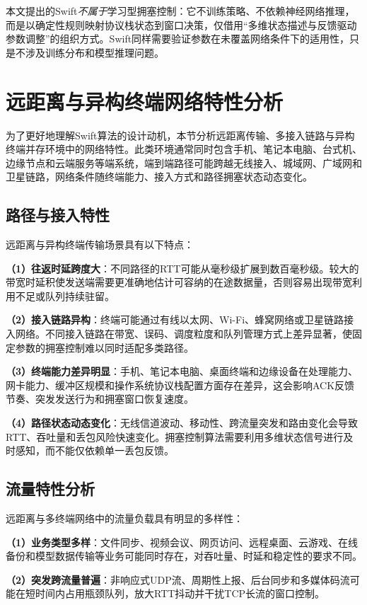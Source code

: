 本文提出的Swift\emph{不属于}学习型拥塞控制：它不训练策略、不依赖神经网络推理，而是以确定性规则映射协议栈状态到窗口决策，仅借用“多维状态描述与反馈驱动参数调整”的组织方式。Swift同样需要验证参数在未覆盖网络条件下的适用性，只是不涉及训练分布和模型推理问题。

\section{远距离与异构终端网络特性分析}

为了更好地理解Swift算法的设计动机，本节分析远距离传输、多接入链路与异构终端并存环境中的网络特性。此类环境通常同时包含手机、笔记本电脑、台式机、边缘节点和云端服务等端系统，端到端路径可能跨越无线接入、城域网、广域网和卫星链路，网络条件随终端能力、接入方式和路径拥塞状态动态变化。

\subsection{路径与接入特性}

远距离与异构终端传输场景具有以下特点：

\textbf{（1）往返时延跨度大}：不同路径的RTT可能从毫秒级扩展到数百毫秒级。较大的带宽时延积使发送端需要更准确地估计可容纳的在途数据量，否则容易出现带宽利用不足或队列持续驻留。

\textbf{（2）接入链路异构}：终端可能通过有线以太网、Wi-Fi、蜂窝网络或卫星链路接入网络。不同接入链路在带宽、误码、调度粒度和队列管理方式上差异显著，使固定参数的拥塞控制难以同时适配多类路径。

\textbf{（3）终端能力差异明显}：手机、笔记本电脑、桌面终端和边缘设备在处理能力、网卡能力、缓冲区规模和操作系统协议栈配置方面存在差异，这会影响ACK反馈节奏、突发发送行为和拥塞窗口恢复速度。

\textbf{（4）路径状态动态变化}：无线信道波动、移动性、跨流量突发和路由变化会导致RTT、吞吐量和丢包风险快速变化。拥塞控制算法需要利用多维状态信号进行及时感知，而不能仅依赖单一丢包反馈。

\subsection{流量特性分析}

远距离与多终端网络中的流量负载具有明显的多样性：

\textbf{（1）业务类型多样}：文件同步、视频会议、网页访问、远程桌面、云游戏、在线备份和模型数据传输等业务可能同时存在，对吞吐量、时延和稳定性的要求不同。

\textbf{（2）突发跨流量普遍}：非响应式UDP流、周期性上报、后台同步和多媒体码流可能在短时间内占用瓶颈队列，放大RTT抖动并干扰TCP长流的窗口控制。


